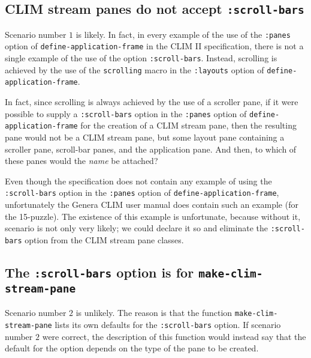\subsection{CLIM stream panes do not accept \texttt{:scroll-bars}}

Scenario number $1$ is likely.  In fact, in every example of the use
of the \texttt{:panes} option of \texttt{define-application-frame} in
the CLIM II specification, there is not a single example of the use of
the option \texttt{:scroll-bars}.  Instead, scrolling is achieved
by the use of the \texttt{scrolling} macro in the \texttt{:layouts}
option of \texttt{define-application-frame}.

In fact, since scrolling is always achieved by the use of a scroller
pane, if it were possible to supply a \texttt{:scroll-bars} option in
the \texttt{:panes} option of \texttt{define-application-frame} for
the creation of a CLIM stream pane, then the resulting pane would not
be a CLIM stream pane, but some layout pane containing a scroller
pane, scroll-bar panes, and the application pane.  And then, to which
of these panes would the \textit{name} be attached?

Even though the specification does not contain any example of using
the \texttt{:scroll-bars} option in the \texttt{:panes} option of
\texttt{define-application-frame}, unfortunately the Genera CLIM user
manual does contain such an example (for the 15-puzzle).  The
existence of this example is unfortunate, because without it, scenario
is not only very likely; we could declare it so and eliminate the
\texttt{:scroll-bars} option from the CLIM stream pane classes.

\subsection{The \texttt{:scroll-bars} option is for \texttt{make-clim-stream-pane}}

Scenario number $2$ is unlikely.  The reason is that the function
\texttt{make-clim-stream-pane} lists its own defaults for the
\texttt{:scroll-bars} option.  If scenario number $2$ were correct,
the description of this function would instead say that the default
for the option depends on the type of the pane to be created.
